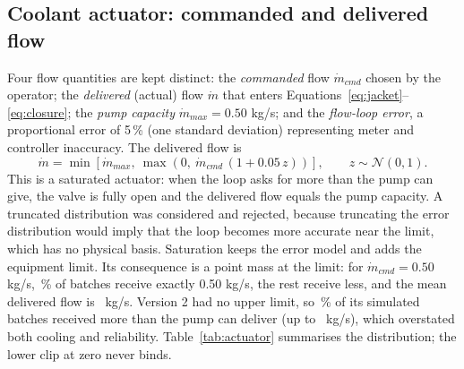 \documentclass[11pt,letterpaper]{article}
\newcommand{\mdot}{\dot m}
\begin{document}
\subsection{Coolant actuator: commanded and delivered flow}\label{sec:actuator}
Four flow quantities are kept distinct: the \emph{commanded} flow \(\mdot_{cmd}\) chosen by the operator; the \emph{delivered} (actual) flow \(\mdot\) that enters Equations~\ref{eq:jacket}--\ref{eq:closure}; the \emph{pump capacity} \(\mdot_{max}=0.50\) kg/s; and the \emph{flow-loop error}, a proportional error of 5\,\% (one standard deviation) representing meter and controller inaccuracy. The delivered flow is
\begin{equation}
\mdot = \min\!\left[\mdot_{max},\ \max\!\left(0,\ \mdot_{cmd}\,(1 + 0.05\,z)\right)\right], \qquad z\sim\mathcal{N}(0,1). \label{eq:actuator}
\end{equation}
This is a saturated actuator: when the loop asks for more than the pump can give, the valve is fully open and the delivered flow equals the pump capacity. A truncated distribution was considered and rejected, because truncating the error distribution would imply that the loop becomes more accurate near the limit, which has no physical basis. Saturation keeps the error model and adds the equipment limit. Its consequence is a point mass at the limit: for \(\mdot_{cmd}=0.50\) kg/s, \vFracAtCap\,\% of batches receive exactly 0.50 kg/s, the rest receive less, and the mean delivered flow is \vMeanActual\ kg/s. Version 2 had no upper limit, so \vVTwoAbove\,\% of its simulated batches received more than the pump can deliver (up to \vVTwoMax\ kg/s), which overstated both cooling and reliability. Table~\ref{tab:actuator} summarises the distribution; the lower clip at zero never binds.

\begin{table}[H]
\centering
\caption{Delivered coolant flow for three commanded flows (independent validation set, \(n\) = \vNVal).}\label{tab:actuator}

\end{table}
\end{document}

